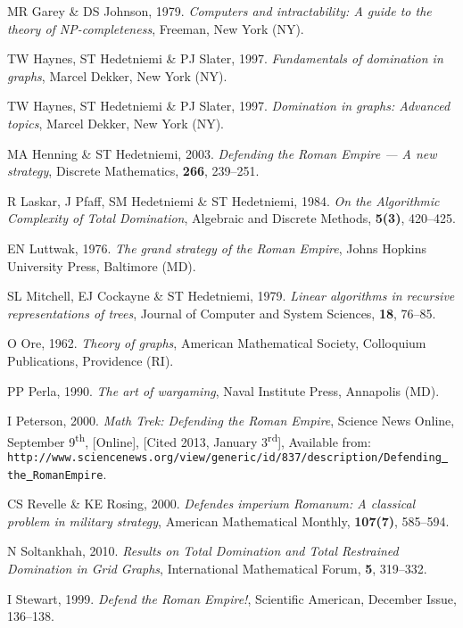 \documentclass[10pt,a4paper]{article}
\begin{document}
{\begin{thebibliography}{10}
 {\sc MR Garey \& DS Johnson}, 1979. {\em Computers and intractability: A guide to the theory of NP-completeness}, Freeman, New York (NY).
 
 {\sc TW Haynes, ST Hedetniemi \& PJ Slater}, 1997. {\em Fundamentals of domination in graphs}, Marcel Dekker, New York (NY).
 
 {\sc TW Haynes, ST Hedetniemi \& PJ Slater}, 1997. {\em Domination in graphs: Advanced topics}, Marcel Dekker, New York (NY).
 
 {\sc MA Henning \& ST Hedetniemi}, 2003. {\em Defending the Roman Empire --- A new strategy}, Discrete Mathematics, {\bf 266}, 239--251.

 {\sc R Laskar, J Pfaff, SM Hedetniemi \& ST Hedetniemi}, 1984. {\em  On the Algorithmic Complexity of Total Domination}, Algebraic and Discrete Methods, {\bf 5(3)}, 420--425.
 
 {\sc EN Luttwak}, 1976. {\em The grand strategy of the Roman Empire}, Johns Hopkins University Press, Baltimore (MD).
 
 {\sc SL Mitchell, EJ Cockayne \& ST Hedetniemi}, 1979. {\em Linear algorithms in recursive representations of trees}, Journal of Computer and System Sciences, {\bf 18}, 76--85.
 
 {\sc O Ore}, 1962. {\em Theory of graphs}, American Mathematical Society, Colloquium Publications, Providence (RI).

 {\sc PP Perla}, 1990. {\em The art of wargaming}, Naval Institute Press, Annapolis (MD). 
 
 {\sc I Peterson}, 2000. {\em Math Trek: Defending the Roman Empire}, Science News Online, September 9\textsuperscript{th}, [Online], [Cited 2013, January 3\textsuperscript{rd}], Available from: {\tt http://www.sciencenews.org/view/generic/id/837/description/Defending\underline{ }the\underline{ }RomanEmpire}.
 
 {\sc CS Revelle \& KE Rosing}, 2000. {\em Defendes imperium Romanum: A classical problem in military strategy}, American Mathematical Monthly, {\bf 107(7)}, 585--594.

 {\sc N Soltankhah}, 2010. {\em Results on Total Domination and Total Restrained Domination in Grid Graphs}, International Mathematical Forum, {\bf 5}, 319--332. 
 
 {\sc I Stewart}, 1999. {\em Defend the Roman Empire!}, Scientific American, December Issue, 136--138.


\end{thebibliography}}
\end{document}
